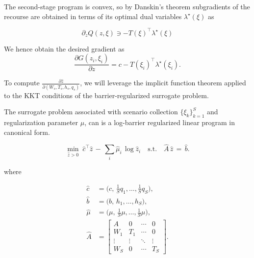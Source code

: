 \documentclass{article}
\begin{document}
The second-stage program is convex, so by Danskin’s theorem subgradients of the recourse are obtained in terms of its optimal dual variables $\lambda^\star(\xi)$ as

\begin{equation}
\partial_z Q(z,\xi) \ni -T(\xi)^\top \lambda^\star(\xi)
\end{equation}

We hence obtain the desired gradient as
\begin{equation}
\frac{\partial G(z_i,\xi_i)}{\partial z} = c - T(\xi_i)^\top \lambda^\star(\xi_i).
\end{equation}

To compute $\tfrac{\partial \hat z}{\partial (W_s,T_s,h_s,q_s)}$, we will leverage the implicit function theorem applied to the KKT conditions of the barrier-regularized surrogate problem.

The surrogate problem associated with scenario collection $\{\xi_k\}_{k=1}^S$ and regularization parameter $\mu$, can is a log-barrier regularized linear program in canonical form.

\begin{equation}
\min_{\hat z > 0} \; \hat c^\top \hat z \, - \, \sum_{i} \hat \mu_i \, \log \hat z_i \quad \text{s.t.} \quad \hat A \, \hat z \,=\, \hat b.
\end{equation}

where

\begin{subequations}\label{eq:surrogate-data}
\begin{align}
\hat c &= \big(c, \, \tfrac{1}{S}q_1,\dots,\tfrac{1}{S}q_S\big),\label{eq:surrogate-data-c}\\
\hat b &= \big(b, \, h_1,\dots,h_S\big),\label{eq:surrogate-data-b}\\
\hat \mu &= \big(\mu, \, \tfrac{1}{S}\mu,\dots,\tfrac{1}{S}\mu\big),\label{eq:surrogate-data-mu}\\[4pt]
\hat A &= \begin{bmatrix}
A & 0 & \cdots & 0 \\
W_1 & T_1 & \cdots & 0 \\
\vdots & \vdots & \ddots & \vdots \\
W_S & 0 & \cdots & T_S
\end{bmatrix}.\label{eq:surrogate-data-A}
\end{align}
\end{subequations}
\end{document}
